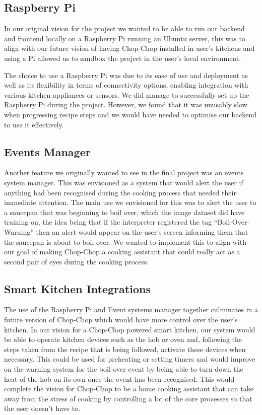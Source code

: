 \documentclass{article}
\begin{document}
\subsection{Raspberry Pi}
In our original vision for the project we wanted to be able to run our backend and frontend locally on a Raspberry Pi running an Ubuntu server, this was to align with our future vision of having Chop-Chop installed in user's kitchens and using a Pi allowed us to sandbox the project in the user's local environment.

The choice to use a Raspberry Pi was due to its ease of use and deployment as well as its flexibility in terms of connectivity options, enabling integration with various kitchen appliances or sensors. We did manage to successfully set up the Raspberry Pi during the project. However, we found that it was unusably slow when progressing recipe steps and we would have needed to optimise our backend to use it effectively.
\subsection{Events Manager}
Another feature we originally wanted to see in the final project was an events system manager. This was envisioned as a system that would alert the user if anything had been recognised during the cooking process that needed their immediate attention. The main use we envisioned for this was to alert the user to a saucepan that was beginning to boil over, which the image dataset did have training on, the idea being that if the interpreter registered the tag “Boil-Over-Warning” then an alert would appear on the user’s screen informing them that the saucepan is about to boil over. We wanted to implement this to align with our goal of making Chop-Chop a cooking assistant that could really act as a second pair of eyes during the cooking process.
\subsection{Smart Kitchen Integrations}
The use of the Raspberry Pi and Event systems manager together culminates in a future version of Chop-Chop which would have more control over the user’s kitchen. In our vision for a Chop-Chop powered smart kitchen, our system would be able to operate kitchen devices such as the hob or oven and, following the steps taken from the recipe that is being followed, activate these devices when necessary. This could be used for preheating or setting timers and would improve on the warning system for the boil-over event by being able to turn down the heat of the hob on its own once the event has been recognised. This would complete the vision for Chop-Chop to be a home cooking assistant that can take away from the stress of cooking by controlling a lot of the core processes so that the user doesn’t have to.
\end{document}
